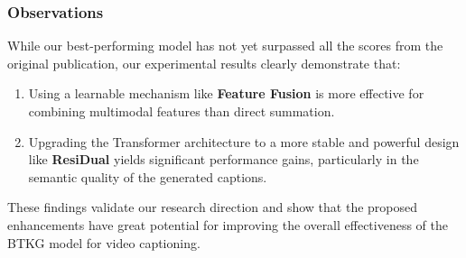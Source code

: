 \subsubsection{Observations}

While our best-performing model has not yet surpassed all the scores from the original publication, our experimental results clearly demonstrate that:

\begin{enumerate}[nosep]
    \item Using a learnable mechanism like \textbf{Feature Fusion} is more effective for combining multimodal features than direct summation.
    
    \item Upgrading the Transformer architecture to a more stable and powerful design like \textbf{ResiDual} yields significant performance gains, particularly in the semantic quality of the generated captions.
\end{enumerate}

These findings validate our research direction and show that the proposed enhancements have great potential for improving the overall effectiveness of the BTKG model for video captioning.
